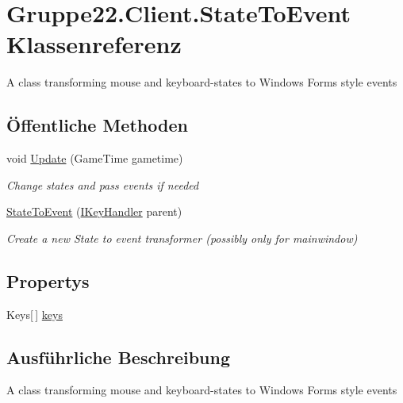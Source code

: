 \hypertarget{class_gruppe22_1_1_client_1_1_state_to_event}{\section{Gruppe22.\-Client.\-State\-To\-Event Klassenreferenz}
\label{class_gruppe22_1_1_client_1_1_state_to_event}
}


A class transforming mouse and keyboard-\/states to Windows Forms style events  


\subsection*{Öffentliche Methoden}
\begin{DoxyCompactItemize}
\item 
void \hyperlink{class_gruppe22_1_1_client_1_1_state_to_event_a5dda91539d198a68342ab92d123a1f89}{Update} (Game\-Time gametime)
\begin{DoxyCompactList}\small\item\em Change states and pass events if needed \end{DoxyCompactList}\item 
\hyperlink{class_gruppe22_1_1_client_1_1_state_to_event_ab5a1f526f0001a8159baf1390d4e6ad8}{State\-To\-Event} (\hyperlink{interface_gruppe22_1_1_client_1_1_i_key_handler}{I\-Key\-Handler} parent)
\begin{DoxyCompactList}\small\item\em Create a new State to event transformer (possibly only for mainwindow) \end{DoxyCompactList}\end{DoxyCompactItemize}
\subsection*{Propertys}
\begin{DoxyCompactItemize}
\item 
Keys\mbox{[}$\,$\mbox{]} \hyperlink{class_gruppe22_1_1_client_1_1_state_to_event_a65989c04116808478b150febeeb9f8b6}{keys}
\end{DoxyCompactItemize}


\subsection{Ausführliche Beschreibung}
A class transforming mouse and keyboard-\/states to Windows Forms style events 



